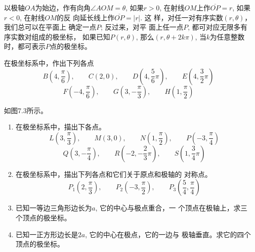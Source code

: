 以极轴$OA$为始边，作有向角$\angle AOM=\theta$, 如果$r>0$, 
在射线$OM$上作$\overline{OP}=r$, 
如果$r<0$, 在射线$OM$的反
向延长线上作$\overline{OP}=|r|$. 这
样，对任一对有序实数$(r,\theta)$，我们总可以在平面上
确定一点$P$; 反过来，对平
面上任一点$P$, 都可对应无限多有序实数对组成的极坐标，
如果已知$P(r,\theta)$, 那么$(r,\theta+2k\pi)$, 当$k$为任意整数
时，都可表示$P$点的极坐标。

\begin{example}
    在极坐标系中，作出下列各点
\[B\left(4,\frac{\pi}{6}\right),\qquad C(2,0),\qquad D\left(4,\frac{5}{6}\pi\right),\qquad E\left(4,\frac{3}{2}\pi\right)\]
\[F\left(-4,\frac{\pi}{6}\right),\qquad G\left(3,-\frac{\pi}{3}\right),\qquad H\left(1,\frac{\pi}{2}\right)\]
\end{example}

\begin{solution}
    如图7.3所示。
\begin{figure}[htp]
    \centering
{}   
    \caption{}
\end{figure}
\end{solution}

\begin{ex}
\begin{enumerate}
    \item 在极坐标系中，描出下各点。
  \[  L\left(3,\frac{\pi}{3}\right),\qquad  M(3,0),\qquad N\left(1,\frac{\pi}{2}\right),\qquad P\left(-3,\frac{\pi}{4}\right)\]
\[    Q\left(3, -\frac{\pi}{4}\right), \qquad R\left(-2,-\frac{2}{3}\pi\right),\qquad S\left(1,\frac{3}{4}\pi \right)\]
\item 在极坐标系中，描出下列各点和它们关于原点和极轴的
    对称点。
\[P_1\left(2,\frac{\pi}{3}\right),\qquad P_2\left(-3,\frac{\pi}{2}\right),\qquad P_3\left(\frac{5}{4},\frac{\pi}{4}\right)\]
    \item 已知一等边三角形边长为$a$, 它的中心与极点重合，一
    个顶点在极轴上，求三个顶点的极坐标。
    \item 已知一正方形边长是$2a$, 它的中心在极点，它的一边与
    极轴垂直。求它的四个顶点的极坐标。
\end{enumerate}
\end{ex}

